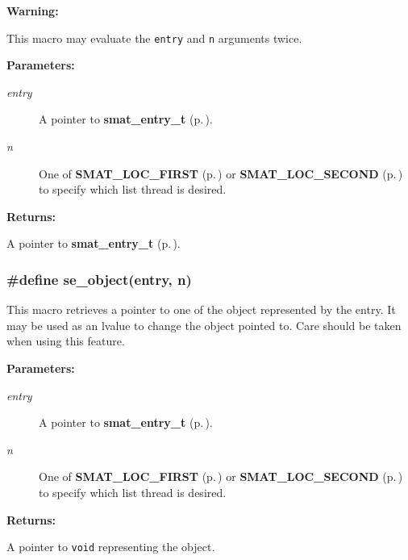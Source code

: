 \begin{Desc}
\item[{\bf Warning: }]\par
This macro may evaluate the {\tt entry} and {\tt n} arguments twice.\end{Desc}
\begin{Desc}
\item[{\bf Parameters: }]\par
\begin{description}
\item[
{\em entry}]A pointer to {\bf smat\_\-entry\_\-t} {\rm (p.\,\pageref{group__dbprim__smat_a2})}. \item[
{\em n}]One of {\bf SMAT\_\-LOC\_\-FIRST} {\rm (p.\,\pageref{group__dbprim__smat_a48a102})} or {\bf SMAT\_\-LOC\_\-SECOND} {\rm (p.\,\pageref{group__dbprim__smat_a48a103})} to specify which list thread is desired.

\end{description}
\end{Desc}
\begin{Desc}
\item[{\bf Returns: }]\par
A pointer to {\bf smat\_\-entry\_\-t} {\rm (p.\,\pageref{group__dbprim__smat_a2})}. \end{Desc}
\subsubsection{\setlength{\rightskip}{0pt plus 5cm}\#define se\_\-object(entry, n)}\label{group__dbprim__smat_a47}




 This macro retrieves a pointer to one of the object represented by the entry. It may be used as an lvalue to change the object pointed to. Care should be taken when using this feature.\begin{Desc}
\item[{\bf Parameters: }]\par
\begin{description}
\item[
{\em entry}]A pointer to {\bf smat\_\-entry\_\-t} {\rm (p.\,\pageref{group__dbprim__smat_a2})}. \item[
{\em n}]One of {\bf SMAT\_\-LOC\_\-FIRST} {\rm (p.\,\pageref{group__dbprim__smat_a48a102})} or {\bf SMAT\_\-LOC\_\-SECOND} {\rm (p.\,\pageref{group__dbprim__smat_a48a103})} to specify which list thread is desired.

\end{description}
\end{Desc}
\begin{Desc}
\item[{\bf Returns: }]\par
A pointer to {\tt void} representing the object. \end{Desc}
